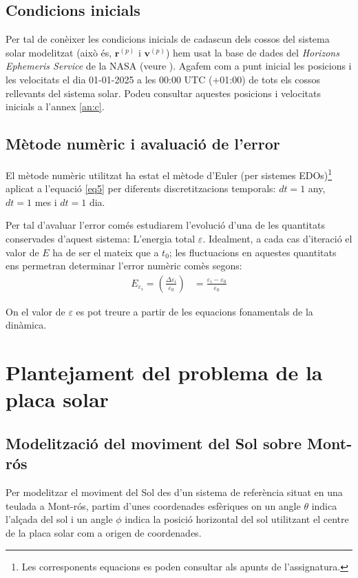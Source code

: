 \documentclass[10pt, twoside, a4paper]{article}
\begin{document}
\subsection{Condicions inicials}
Per tal de conèixer les condicions inicials de cadascun dels cossos del sistema solar modelitzat (això és, $\mathbf{r}^{(p)}$ i $\mathbf{v}^{(p)}$) hem usat la base de dades del \textit{Horizons Ephemeris Service} de la NASA (veure \cite{ref3}). Agafem com a punt inicial les posicions i les velocitats el dia 01-01-2025 a les 00:00 UTC (+01:00) de tots els cossos rellevants del sistema solar. Podeu consultar aquestes posicions i velocitats inicials a l'annex \ref{an:c}.

\subsection{Mètode numèric i avaluació de l'error}
El mètode numèric utilitzat ha estat el mètode d'Euler (per sistemes EDOs)\footnote{Les corresponents equacions es poden consultar als apunts de l'assignatura.} aplicat a l'equació \eqref{eq5} per diferents discretitzacions temporals: $dt = 1$ any, $dt = 1$ mes i $dt = 1$ dia.

Per tal d'avaluar l'error comés estudiarem l'evolució d'una de les quantitats conservades d'aquest sistema: L'energia total $\varepsilon$. Idealment, a cada cas d'iteració el valor de $E$ ha de ser el mateix que a $t_0$; les fluctuacions en aquestes quantitats ens permetran determinar l'error numèric comès segons:
\begin{align}
    E_{\varepsilon_i} = \left( \frac{\Delta \varepsilon_i}{\varepsilon_0} \right) & = \frac{\varepsilon_i - \varepsilon_0}{\varepsilon_0} 
\end{align}

On el valor de $\varepsilon$ es pot treure a partir de les equacions fonamentals de la dinàmica.

\section{Plantejament del problema de la placa solar}

\subsection{Modelització del moviment del Sol sobre Mont-rós}
Per modelitzar el moviment del Sol des d'un sistema de referència situat en una teulada a Mont-rós, partim d'unes coordenades esfèriques on un angle $\theta$ indica l'alçada del sol i un angle $\phi$ indica la posició horizontal del sol utilitzant el centre de la placa solar com a origen de coordenades.
\end{document}
